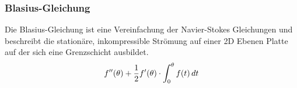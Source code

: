 \documentclass[
	11pt, %
	aspectratio=169, %
]{beamer}
\begin{document}
	\begin{frame}
		\frametitle{Blasius-Gleichung}

		Die Blasius-Gleichung ist eine Vereinfachung der Navier-Stokes Gleichungen und beschreibt die stationäre, inkompressible Strömung auf einer 2D Ebenen Platte auf der sich eine Grenzschicht ausbildet.
		$$f''(\theta)+\frac{1}{2} \\ f'(\theta)\cdot\int_{0}^{\theta} f(t) \,dt $$
	\end{frame}
\end{document}
